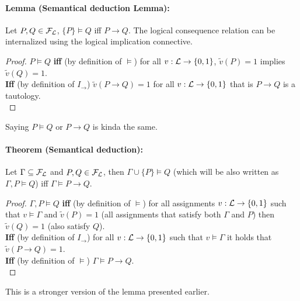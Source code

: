 	\newpage

	\paragraph{Lemma (Semantical deduction Lemma):} Let $P,Q \in \mathcal{F}_\mathcal{L}$, $\{P\} \models Q$ iff $P \rightarrow Q$.  The logical consequence relation can be internalized using the logical implication connective.\\

	\begin{proof}
		$P \models Q$ \textbf{iff} (by definition of $\models$) for all $v: \mathcal{L} \rightarrow \{0,1\}$, $\tilde{v} (P) = 1$ implies $\tilde{v} (Q) = 1$.\\

		\textbf{Iff} (by definition of $I_\rightarrow$) $\tilde{v} (P \rightarrow Q) = 1$ for all $v: \mathcal{L} \rightarrow \{0,1\}$ that is $P \rightarrow Q$ is a tautology.\\
	\end{proof}

	Saying $P \models Q$ or $P \rightarrow Q$ is kinda the same.\\

	\paragraph{Theorem (Semantical deduction):} Let $\Gamma \subseteq \mathcal{F}_\mathcal{L}$ and $P,Q \in \mathcal{F}_\mathcal{L}$, then $\Gamma \cup \{P\} \models Q$ (which will be also written as $\Gamma, P \models Q$) iff $\Gamma \models P \rightarrow Q$.\\

	\begin{proof}
		$\Gamma, P \models Q$ \textbf{iff} (by definition of $\models$) for all assignments $v: \mathcal{L} \rightarrow \{0,1\}$ such that $v \models \Gamma$ and $\tilde{v}(P) = 1$ (all assignments that satisfy both $\Gamma$ and $P$) then $\tilde{v}(Q) = 1$ (also satisfy $Q$).\\

		\textbf{Iff} (by definition of $I_\rightarrow$) for all $v: \mathcal{L} \rightarrow \{0,1\}$ such that $v \models \Gamma$ it holds that $\tilde{v}(P \rightarrow Q) =1$.\\

		\textbf{Iff} (by definition of $\models$) $\Gamma \models P \rightarrow Q$.\\
	\end{proof}

	This is a stronger version of the lemma presented earlier.\\


